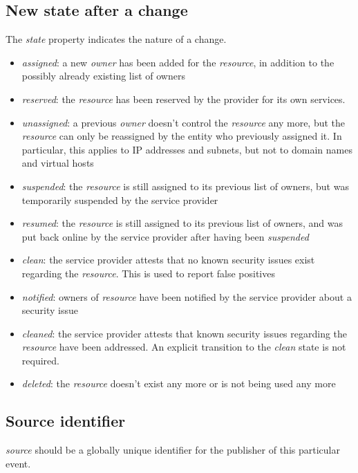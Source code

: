 \documentclass[conference]{IEEEtran}
\begin{document}
\subsection{New state after a change}

The \emph{state} property indicates the nature of a change.

\begin{itemize}
	\item \emph{assigned}: a new \emph{owner} has been added for the \emph{resource}, in addition to the possibly already existing list of owners
	\item \emph{reserved}: the \emph{resource} has been reserved by the provider for its own services.
	\item \emph{unassigned}: a previous \emph{owner} doesn't control the \emph{resource} any more, but the \emph{resource} can only be reassigned by the entity who previously assigned it. In particular, this applies to IP addresses and subnets, but not to domain names and virtual hosts
	\item \emph{suspended}: the \emph{resource} is still assigned to its previous list of owners, but was temporarily suspended by the service provider
	\item \emph{resumed}: the \emph{resource} is still assigned to its previous list of owners, and was put back online by the service provider after having been \emph{suspended}
	\item \emph{clean}: the service provider attests that no known security issues exist regarding the \emph{resource}. This is used to report false positives
	\item \emph{notified}: owners of \emph{resource} have been notified by the service provider about a security issue
	\item \emph{cleaned}: the service provider attests that known security issues regarding the \emph{resource} have been addressed. An explicit transition to the \emph{clean} state is not required.
	\item \emph{deleted}: the \emph{resource} doesn't exist any more or is not being used any more
\end{itemize}

\subsection{Source identifier}

\emph{source} should be a globally unique identifier for the publisher of this particular event.
\end{document}
